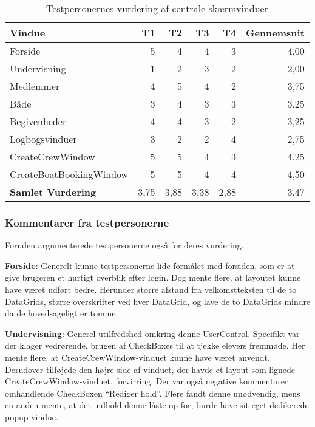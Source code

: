 \begin{table}[htbp]
    \centering
    \caption{Testpersonernes vurdering af centrale skærmvinduer}
    \begin{tabular}{l|rrrr|r}
        \textbf{Vindue} & T1 & T2 & T3 & T4 & \textbf{Gennemsnit} \\
        \midrule
        Forside & 5 & 4 & 4 & 3 & 4,00 \\
        Undervisning & 1 & 2 & 3 & 2 & 2,00 \\
        Medlemmer & 4 & 5 & 4 & 2 & 3,75 \\
        Både & 3 & 4 & 3 & 3 & 3,25 \\
        Begivenheder & 4 & 4 & 3 & 2 & 3,25 \\
        Logbogsvinduer & 3 & 2 & 2 & 4 & 2,75 \\
        CreateCrewWindow & 5 & 5 & 4 & 3 & 4,25 \\
        CreateBoatBookingWindow & 5 & 5 & 4 & 4 & 4,50 \\ \hline
        \textbf{Samlet Vurdering} & 3,75 & 3,88 & 3,38 & 2,88 & 3,47 \\
    \end{tabular}%
    \label{tab:vurderingtest}%
\end{table}%

\subsubsection*{Kommentarer fra testpersonerne}
Foruden  argumenterede testpersonerne også for deres vurdering.

\textbf{Forside}: 
Generelt kunne testpersonerne lide formålet med forsiden, som er at give brugeren et hurtigt overblik efter login. 
Dog mente flere, at layoutet kunne have været udført bedre.
Herunder større afstand fra velkomstteksten til de to DataGrids, større overskrifter ved hver DataGrid, og lave de to DataGrids mindre da de hovedsageligt er tomme. 

\textbf{Undervisning}: 
Generel utilfredshed omkring denne UserControl.
Specifikt var der klager vedrørende, brugen af CheckBoxes til at tjekke elevers fremmøde.
Her mente flere, at CreateCrewWindow-vinduet kunne have været anvendt. 
Derudover tilføjede den højre side af vinduet, der havde et layout som lignede CreateCrewWindow-vinduet, forvirring. 
Der var også negative kommentarer omhandlende CheckBoxen ``Rediger hold''. 
Flere fandt denne unødvendig, mens en anden mente, at det indhold denne låste op for, burde have sit eget dedikerede popup vindue.

